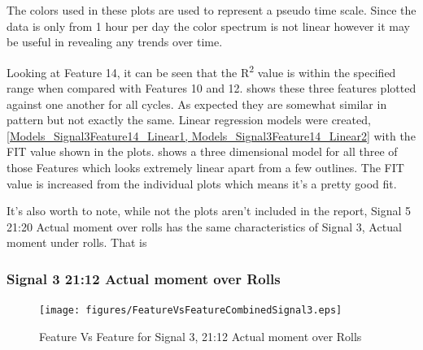 \documentclass[]{article}
\begin{document}
The colors used in these plots are used to represent a pseudo time scale. Since the data is only from 1 hour per day the color spectrum is not linear however it may be useful in revealing any trends over time.

Looking at Feature 14, it can be seen that the R\textsuperscript{2} value is within the specified range when compared with Features 10 and 12.  shows these three features plotted against one another for all cycles. As expected they are somewhat similar in pattern but not exactly the same. Linear regression models were created, \cref{Models_Signal3Feature14_Linear1, Models_Signal3Feature14_Linear2} with the FIT value shown in the plots.  shows a three dimensional model for all three of those Features which looks extremely linear apart from a few outlines. The FIT value is increased from the individual plots which means it's a pretty good fit.

It's also worth to note, while not the plots aren't included in the report, Signal 5 21:20 Actual moment over rolls has the same characteristics of Signal 3, Actual moment under rolls. That is 

\subsubsection*{Signal 3 21:12 Actual moment over Rolls}
\begin{figure}[H]
    \centering
    \texttt{[image: figures/FeatureVsFeatureCombinedSignal3.eps]}
    \caption{Feature Vs Feature for Signal 3, 21:12 Actual moment over Rolls}
    \label{fig:FeatureVsFeatureCombinedSignal3}
\end{figure}
\end{document}
